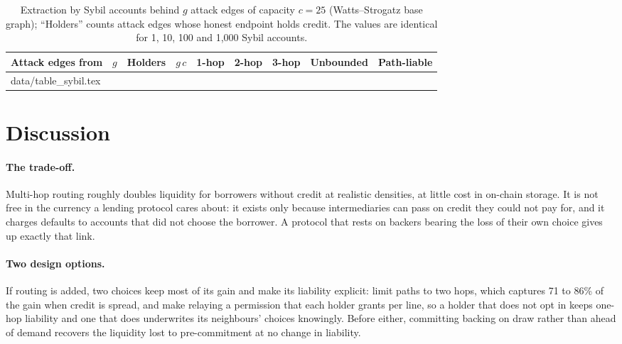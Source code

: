 \documentclass[11pt]{article}
\makeatletter
\theoremstyle{plain}
\theoremstyle{definition}
\newcommand{\inputrows}[1]{\@@input #1 }
\makeatother
\begin{document}
\begin{table}[ht]
  \centering\small
  \caption{Extraction by Sybil accounts behind $g$ attack edges of capacity $c=25$ (Watts--Strogatz
  base graph); ``Holders'' counts attack edges whose honest endpoint holds credit. The values are
  identical for 1, 10, 100 and 1,000 Sybil accounts.}
  \label{tab:sybil}
  \footnotesize\setlength{\tabcolsep}{3.5pt}
  \begin{tabular}{lrrrrrrrr}
    \toprule
    Attack edges from & $g$ & Holders & $g\,c$ & 1-hop & 2-hop & 3-hop & Unbounded & Path-liable \\
    \midrule
    \inputrows{data/table_sybil.tex}
    \bottomrule
  \end{tabular}
\end{table}

\section{Discussion}\label{sec:discussion}

\paragraph{The trade-off.} Multi-hop routing roughly doubles liquidity for borrowers without credit
at realistic densities, at little cost in on-chain storage. It is not free in the currency a lending
protocol cares about: it exists only because intermediaries can pass on credit they could not pay
for, and it charges defaults to accounts that did not choose the borrower. A protocol that rests on
backers bearing the loss of their own choice gives up exactly that link.

\paragraph{Two design options.} If routing is added, two choices keep most of its gain and make its
liability explicit: limit paths to two hops, which captures 71 to 86\% of the gain when credit is
spread, and make relaying a permission that each holder grants per line, so a holder that does not
opt in keeps one-hop liability and one that does underwrites its neighbours' choices knowingly.
Before either, committing backing on draw rather than ahead of demand recovers the liquidity lost to
pre-commitment at no change in liability.
\end{document}
